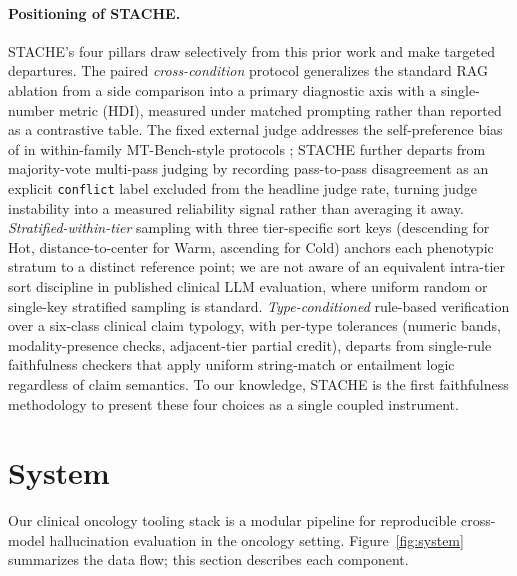 \documentclass[11pt]{article}
\begin{document}
\paragraph{Positioning of STACHE.}
STACHE's four pillars draw selectively from this prior work and make targeted departures. The paired \emph{cross-condition} protocol generalizes the standard RAG ablation \citep{lewis2020rag,shuster2021retrieval,xiong2024benchmarking} from a side comparison into a primary diagnostic axis with a single-number metric (HDI), measured under matched prompting rather than reported as a contrastive table. The fixed external judge addresses the self-preference bias of \citet{panickssery2024llm} in within-family MT-Bench-style protocols \citep{zheng2023judging}; STACHE further departs from majority-vote multi-pass judging by recording pass-to-pass disagreement as an explicit \texttt{conflict} label excluded from the headline judge rate, turning judge instability into a measured reliability signal rather than averaging it away. \emph{Stratified-within-tier} sampling with three tier-specific sort keys (descending for Hot, distance-to-center for Warm, ascending for Cold) anchors each phenotypic stratum to a distinct reference point; we are not aware of an equivalent intra-tier sort discipline in published clinical LLM evaluation, where uniform random or single-key stratified sampling is standard. \emph{Type-conditioned} rule-based verification over a six-class clinical claim typology, with per-type tolerances (numeric bands, modality-presence checks, adjacent-tier partial credit), departs from single-rule faithfulness checkers \citep{maynez2020faithfulness} that apply uniform string-match or entailment logic regardless of claim semantics. To our knowledge, STACHE is the first faithfulness methodology to present these four choices as a single coupled instrument.

\section{System}
\label{sec:system}

Our clinical oncology tooling stack is a modular pipeline for reproducible cross-model hallucination evaluation in the oncology setting. Figure~\ref{fig:system} summarizes the data flow; this section describes each component.
\end{document}
